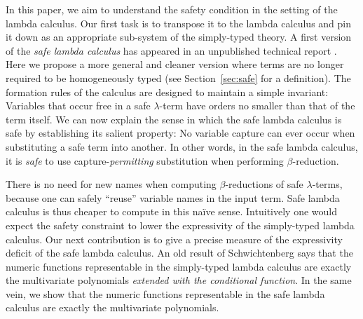\documentclass{llncs}
\begin{document}
In this paper, we aim to understand the safety condition in the
setting of the lambda calculus. Our first task is to transpose it to
the lambda calculus and pin it down as an appropriate sub-system of
the simply-typed theory. A first version of the \emph{safe lambda
  calculus} has appeared in an unpublished technical report
\cite{safety-mirlong2004}. Here we propose a more general and cleaner
version where terms are no longer required to be homogeneously typed
(see Section~\ref{sec:safe} for a definition). The formation rules of
the calculus are designed to maintain a simple invariant: Variables
that occur free in a safe $\lambda$-term have orders no smaller than
that of the term itself.  We can now explain the sense in which the
safe lambda calculus is safe by establishing its salient property: No
variable capture can ever occur when substituting a safe term into
another. In other words, in the safe lambda calculus, it is
\emph{safe} to use capture-\emph{permitting} substitution when
performing $\beta$-reduction.


There is no need for new names when computing $\beta$-reductions of
safe $\lambda$-terms, because one can safely ``reuse'' variable names
in the input term. Safe lambda calculus is thus cheaper to compute in
this na\"ive sense. Intuitively one would expect the safety constraint
to lower the expressivity of the simply-typed lambda calculus. Our
next contribution is to give a precise measure of the expressivity
deficit of the safe lambda calculus. An old result of Schwichtenberg
\cite{citeulike:622637} says that the numeric functions representable
in the simply-typed lambda calculus are exactly the multivariate
polynomials \emph{extended with the conditional function}.  In the
same vein, we show that the numeric functions representable in the
safe lambda calculus are exactly the multivariate polynomials.
\end{document}
